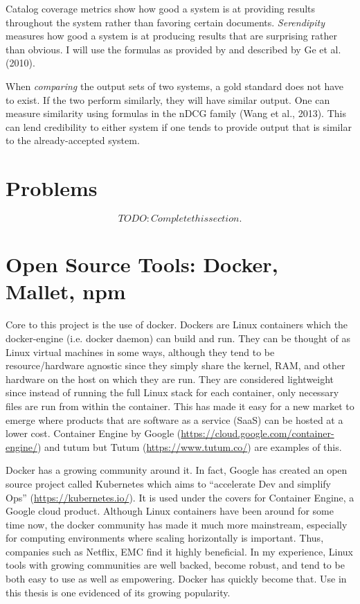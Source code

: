 Catalog coverage metrics show how good a system is at providing results throughout the system rather than favoring certain documents. \textit{Serendipity} measures how good a system is at producing results that are surprising rather than obvious. I will use the formulas as provided by and described by Ge et al. (2010).

When \textit{comparing} the output sets of two systems, a gold standard does not have to exist. If the two perform similarly, they will have similar output. One can measure similarity using formulas in the nDCG family (Wang et al., 2013). This can lend credibility to either system if one tends to provide output that is similar to the already-accepted system.

\section{Problems}
\[TODO: Complete this section.\]

\section{Open Source Tools: Docker, Mallet, npm}
Core to this project is the use of docker. Dockers are Linux containers which the docker-engine (i.e. docker daemon) can build and run. They can be thought of as Linux virtual machines in some ways, although they tend to be resource/hardware agnostic since they simply share the kernel, RAM, and other hardware on the host on which they are run. They are considered lightweight since instead of running the full Linux stack for each container, only necessary files are run from within the container. This has made it easy for a new market to emerge where products that are software as a service (SaaS) can be hosted at a lower cost. Container Engine by Google (\url{https://cloud.google.com/container-engine/}) and tutum but Tutum (\url{https://www.tutum.co/}) are examples of this.

Docker has a growing community around it. In fact, Google has created an open source project called Kubernetes which aims to ``accelerate Dev and simplify Ops'' (\url{https://kubernetes.io/}). It is used under the covers for Container Engine, a Google cloud product. Although Linux containers have been around for some time now, the docker community has made it much more mainstream, especially for computing environments where scaling horizontally is important. Thus, companies such as Netflix, EMC find it highly beneficial. In my experience, Linux tools with growing communities are well backed, become robust, and tend to be both easy to use as well as empowering.
Docker has quickly become that. Use in this thesis is one evidenced of its growing popularity. %
